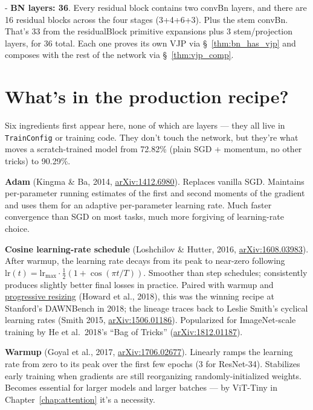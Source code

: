 - \textbf{BN layers: 36}. Every residual block contains two convBn
  layers, and there are 16 residual blocks across the four stages
  (3+4+6+3). Plus the stem convBn. That's 33 from the
  residualBlock primitive expansions plus 3 stem/projection layers,
  for 36 total. Each one proves its own VJP via
  \S~\ref{thm:bn_has_vjp} and composes with the rest of the network
  via \S~\ref{thm:vjp_comp}.

\section{What's in the production recipe?}

Six ingredients first appear here, none of which are layers --- they
all live in \texttt{TrainConfig} or training code. They don't touch
the network, but they're what moves a scratch-trained model from 72.82\%
(plain SGD + momentum, no other tricks) to 90.29\%.

\textbf{Adam} (Kingma \& Ba, 2014,
\href{https://arxiv.org/abs/1412.6980}{arXiv:1412.6980}). Replaces
vanilla SGD. Maintains
per-parameter running estimates of the first and second moments of
the gradient and uses them for an adaptive per-parameter learning
rate. Much faster convergence than SGD on most tasks, much more
forgiving of learning-rate choice.

\textbf{Cosine learning-rate schedule} (Loshchilov \& Hutter, 2016,
\href{https://arxiv.org/abs/1608.03983}{arXiv:1608.03983}).
After warmup, the learning rate decays from its peak to near-zero
following $\mathrm{lr}(t) = \mathrm{lr}_{\max} \cdot \tfrac{1}{2}(1 +
\cos(\pi t / T))$. Smoother than step schedules; consistently produces
slightly better final losses in practice. Paired with warmup and
\href{https://www.fast.ai/posts/2018-04-30-dawnbench-fastai.html}{progressive
resizing} (Howard et al., 2018), this was the winning recipe at
Stanford's DAWNBench in 2018; the lineage traces back to Leslie
Smith's cyclical learning rates (Smith 2015,
\href{https://arxiv.org/abs/1506.01186}{arXiv:1506.01186}).
Popularized for ImageNet-scale training by He et al.\ 2018's
``Bag of Tricks''
(\href{https://arxiv.org/abs/1812.01187}{arXiv:1812.01187}).

\textbf{Warmup} (Goyal et al., 2017,
\href{https://arxiv.org/abs/1706.02677}{arXiv:1706.02677}). Linearly
ramps the learning rate from zero to its
peak over the first few epochs (3 for ResNet-34). Stabilizes early
training when gradients are still reorganizing randomly-initialized
weights. Becomes essential for larger models and larger batches --- by
ViT-Tiny in Chapter~\ref{chap:attention} it's a necessity.

